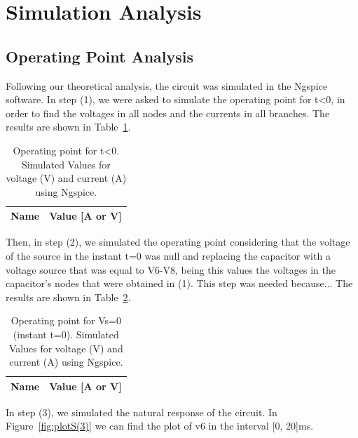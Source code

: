 \section{Simulation Analysis}
\label{sec:simulation}

\subsection{Operating Point Analysis}

Following our theoretical analysis, the circuit was simulated in the Ngspice software. 
In step (1), we were asked to simulate the operating point for t<0, in order to find the voltages in all nodes and the currents in all branches. The results are shown in Table~\ref{tab:alinea1}.

\begin{table}[h]
  \centering
  \begin{tabular}{|l|r|}
    \hline    
    {\bf Name} & {\bf Value [A or V]} \\ \hline
    
  \end{tabular}
  \caption{Operating point for t<0. Simulated Values for voltage (V) and current (A) using Ngspice.}
  \label{tab:alinea1}
\end{table}

Then, in step (2), we simulated the operating point considering that the voltage of the source in the instant t=0 was null and replacing the capacitor with a voltage source that was equal to V6-V8, being this values the voltages in the capacitor's nodes that were obtained in (1). This step was needed because... The results are shown in Table~\ref{tab:alinea2}.

\begin{table}[h]
  \centering
  \begin{tabular}{|l|r|}
    \hline    
    {\bf Name} & {\bf Value [A or V]} \\ \hline
    
  \end{tabular}
  \caption{Operating point for Vs=0 (instant t=0). Simulated Values for voltage (V) and current (A) using Ngspice.}
  \label{tab:alinea2}
\end{table}

In step (3), we simulated the natural response of the circuit. In Figure~\ref{fig:plotS(3)} we can find the plot of v6 in the interval [0, 20]ms.

